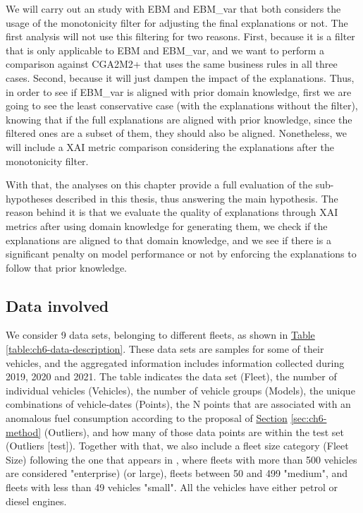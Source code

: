 We will carry out an study with EBM and EBM\_var that both considers the usage of the monotonicity filter for adjusting the final explanations or not. The first analysis will not use this filtering for two reasons. First, because it is a filter that is only applicable to EBM and EBM\_var, and we want to perform a comparison against CGA2M2+ that uses the same business rules in all three cases. Second, because it will just dampen the impact of the explanations. Thus, in order to see if EBM\_var is aligned with prior domain knowledge, first we are going to see the least conservative case (with the explanations without the filter), knowing that if the full explanations are aligned with prior knowledge, since the filtered ones are a subset of them, they should also be aligned. Nonetheless, we will include a XAI metric comparison considering the explanations after the monotonicity filter.

With that, the analyses on this chapter provide a full evaluation of the sub-hypotheses described in this thesis, thus answering the main hypothesis. The reason behind it is that we evaluate the quality of explanations through XAI metrics after using domain knowledge for generating them, we  check if the explanations are aligned to that domain knowledge, and we see if there is a significant penalty on model performance or not by enforcing the explanations to follow that prior knowledge.

\subsection{Data involved}\label{subsec:ch6-DataFleet}
We consider 9 data sets, belonging to different fleets, as shown in \hyperref[table:ch6-data-description]{Table} \ref{table:ch6-data-description}. These data sets are samples for some of their vehicles, and the aggregated information includes information collected during 2019, 2020 and 2021. The table indicates the data set (Fleet), the number of individual vehicles (Vehicles), the number of vehicle groups (Models), the unique combinations of vehicle-dates (Points), the N points that are associated with an anomalous fuel consumption according to the proposal of \hyperref[sec:ch6-method]{Section} \ref{sec:ch6-method} (Outliers), and how many of those data points are within the test set (Outliers [test]). Together with that, we also include a fleet size category (Fleet Size) following the one that appears in \parencite{fleet2021trends}, where fleets with more than 500 vehicles are considered "enterprise) (or large), fleets between 50 and 499 "medium", and fleets with less than 49 vehicles "small". All the vehicles have either petrol or diesel engines.

